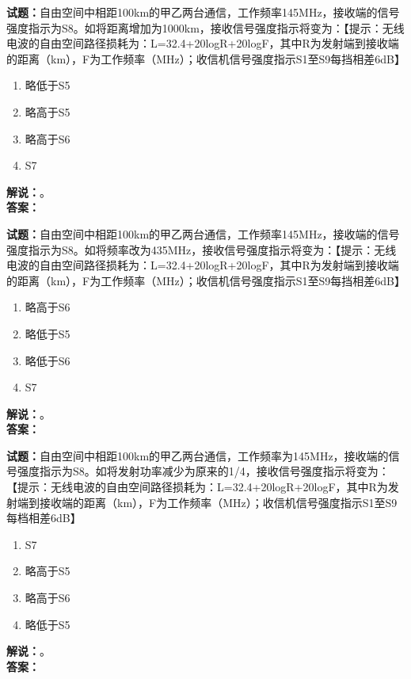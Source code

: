 \documentclass{ctexbook}
\begin{document}
\bigskip




\noindent\textbf{试题：}自由空间中相距100km的甲乙两台通信，工作频率145\unit{\MHz}，接收端的信号强度指示为S8。如将距离增加为1000km，接收信号强度指示将变为：【提示：无线电波的自由空间路径损耗为：L=32.4+20logR+20logF，其中R为发射端到接收端的距离（km），F为工作频率（\unit{\MHz}）；收信机信号强度指示S1至S9每挡相差6dB】
\begin{enumerate}[leftmargin=3em]
\item 略低于S5
\item 略高于S5
\item 略高于S6
\item S7
\end{enumerate}
\noindent\textbf{解说：}\textbf{}。\\\noindent\textbf{答案：}

\bigskip




\noindent\textbf{试题：}自由空间中相距100km的甲乙两台通信，工作频率145\unit{\MHz}，接收端的信号强度指示为S8。如将频率改为435\unit{\MHz}，接收信号强度指示将变为：【提示：无线电波的自由空间路径损耗为：L=32.4+20logR+20logF，其中R为发射端到接收端的距离（km），F为工作频率（\unit{\MHz}）；收信机信号强度指示S1至S9每挡相差6dB】
\begin{enumerate}[leftmargin=3em]
\item 略高于S6
\item 略低于S5
\item 略低于S6
\item S7
\end{enumerate}
\noindent\textbf{解说：}\textbf{}。\\\noindent\textbf{答案：}

\bigskip




\noindent\textbf{试题：}自由空间中相距100km的甲乙两台通信，工作频率为145\unit{\MHz}，接收端的信号强度指示为S8。如将发射功率减少为原来的1/4，接收信号强度指示将变为：【提示：无线电波的自由空间路径损耗为：L=32.4+20logR+20logF，其中R为发射端到接收端的距离（km），F为工作频率（\unit{\MHz}）；收信机信号强度指示S1至S9每档相差6dB】
\begin{enumerate}[leftmargin=3em]
\item S7
\item 略高于S5
\item 略高于S6
\item 略低于S5
\end{enumerate}
\noindent\textbf{解说：}\textbf{}。\\\noindent\textbf{答案：}
\end{document}
